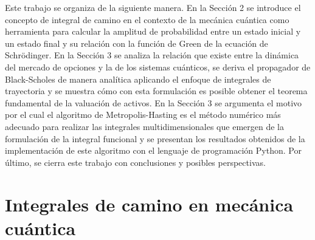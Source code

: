 \documentclass[11pt,a4paper]{article}
\begin{document}
Este trabajo se organiza de la siguiente manera. En la Secci\'on 2 se introduce el concepto de integral de camino en el contexto de la mec\'anica cu\'antica como herramienta para calcular la amplitud de probabilidad entre un estado inicial y un estado final y su relaci\'on con la funci\'on de Green de la ecuación de Schr\"odinger. En la Secci\'on 3 se analiza la relaci\'on que existe entre la din\'amica del mercado de opciones y la de los sistemas cu\'anticos, se deriva el propagador de Black-Scholes de manera anal\'itica aplicando el enfoque de integrales de trayectoria y se muestra c\'omo con esta formulaci\'on es posible obtener el teorema fundamental de la valuación de activos. En la Secci\'on 3 se argumenta el motivo por el cual el algoritmo de Metropolis-Hasting es el m\'etodo num\'erico m\'as adecuado para realizar las integrales multidimensionales que emergen de la formulaci\'on de la integral funcional y se presentan los resultados obtenidos de la implementaci\'on de este algoritmo con el lenguaje de programaci\'on Python. Por \'ultimo, se cierra este trabajo con conclusiones y posibles perspectivas.

\section{Integrales de camino en mec\'anica cu\'antica}
\end{document}
